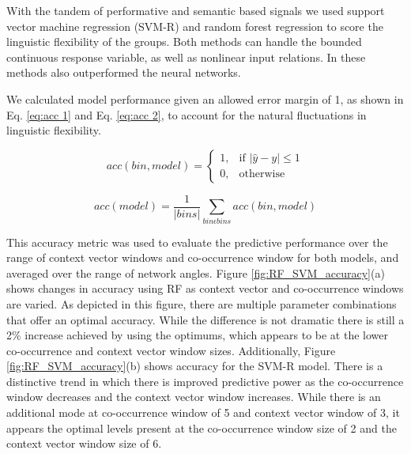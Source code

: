 \documentclass[11pt, a4paper]{article}
\begin{document}
With the tandem of performative and semantic based signals we used support vector machine regression (SVM-R) and random forest regression to score the linguistic flexibility of the groups. Both methods can handle the bounded continuous response variable, as well as nonlinear input relations. In  these methods also outperformed the neural networks.

We calculated model performance given an allowed error margin of 1, as shown in Eq. \ref{eq:acc 1} and Eq. \ref{eq:acc 2}, to account for the natural fluctuations in linguistic flexibility.

\begin{equation}
\label{eq:acc 1}
acc(bin, model) = 
\begin{cases} 
1, & \text{if } |\hat{y}-y| \leq 1 \\
0, & \text{otherwise}
\end{cases}
\end{equation}

\begin{equation}
\label{eq:acc 2}
acc(model) = \frac{1}{|bins|} \sum_{bin  \epsilon  bins} acc(bin, model)
\end{equation}

This accuracy metric was used to evaluate the predictive performance over the range of context vector windows and co-occurrence window for both models, and averaged over the range of network angles.  Figure \ref{fig:RF_SVM_accuracy}(a) shows changes in accuracy using RF as context vector and co-occurrence windows are varied. As depicted in this figure, there are multiple parameter combinations that offer an optimal accuracy. While the difference is not dramatic there is still a 2\% increase achieved by using the optimums, which appears to be at the lower co-occurrence and context vector window sizes. Additionally, Figure \ref{fig:RF_SVM_accuracy}(b) shows accuracy for the SVM-R model. There is a distinctive trend in which there is improved predictive power as the co-occurrence window decreases and the context vector window increases. While there is an additional mode at co-occurrence window of 5 and context vector window of 3, it appears the optimal levels present at the co-occurrence window size of 2 and the context vector window size of 6.
\end{document}
